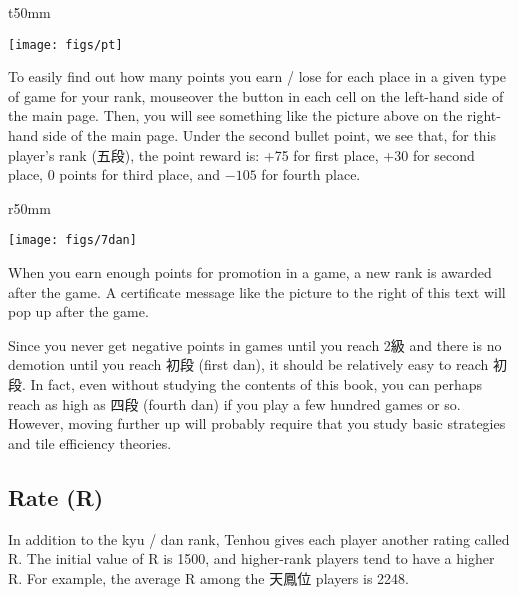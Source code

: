 \begin{wrapfigure}{t}{50mm}
\vspace{-10pt}
\begin{center}
\texttt{[image: figs/pt]}
\end{center}
\vspace{-20pt}
\end{wrapfigure}
To easily find out how many points you earn / lose for each place in a given type of game for your rank, mouseover the  button in each cell on the left-hand side of the main page. Then, you will see something like the picture above on the right-hand side of the main page. Under the second bullet point, we see that, for this player's rank (五段), the point reward is: +75 for first place, +30 for second place, 0 points for third place, and $-105$ for fourth place. 

\bigskip
\begin{wrapfigure}{r}{50mm}
\vspace{-25pt}
\begin{center}
\texttt{[image: figs/7dan]}
\end{center}
\vspace{-25pt}
\end{wrapfigure}
When you earn enough points for promotion in a game, a new rank is awarded after the game. A certificate message like the picture to the right of this text will pop up after the game. 

\bigskip
Since you never get negative points in games until you reach 2級 and there is no demotion until you reach 初段 (first {\jap dan}), it should be relatively easy to reach 初段. In fact, even without studying the contents of this book, you can perhaps reach as high as 四段 (fourth {\jap dan}) if you play a few hundred games or so. However, moving further up will probably require that you study basic strategies and tile efficiency theories. 

\bigskip
\subsection{Rate (R)}

In addition to the {\jap kyu / dan} rank, {\jap Tenhou} gives each player another rating called R. The initial value of R is 1500, and higher-rank players tend to have a higher R. For example, the average R among the 天鳳位 players is 2248.%

